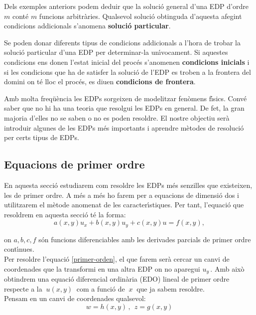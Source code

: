 \documentclass[12pt]{article}
\begin{document}
Dels exemples anteriors podem deduir que la soluci{\'o} general d'una EDP d'ordre $m$ cont{\'e} $m$ funcions arbitr{\`a}ries.
Qualsevol soluci{\'o} obtinguda d'aquesta afegint condicions addicionals s'anomena \textbf{soluci{\'o} particular}.

Se poden donar diferents tipus de condicions addicionals a l'hora de trobar la soluci{\'o} particular d'una EDP
per  determinar-la un{\'\i}vocament. Si aquestes condicions ens donen l'estat inicial del proc{\'e}s s'anomenen \textbf{condicions inicials} i si les condicions que ha de satisfer la soluci{\'o} de l'EDP es troben a la frontera del domini on t{\'e} lloc el proc{\'e}s,  es diuen \textbf{condicions de frontera}.

\vspace{0.4cm}
Amb molta freq{\"u}{\`e}ncia les EDPs sorgeixen de modelitzar fen{\`o}mens f{\'\i}sics. Conv{\'e} saber que no hi ha una teoria que resolgui les EDPs en general. De fet, la gran majoria d'elles no se saben o no es poden resoldre. El nostre objectiu ser{\`a} introduir algunes de les EDPs m{\'e}s importants i aprendre m{\`e}todes de resoluci{\'o} per certs tipus de EDPs.


\subsection{Equacions de primer ordre}

En aquesta secci{\'o} estudiarem com resoldre les EDPs m{\'e}s senzilles que existeixen, les de primer ordre. A m{\'e}s a m{\'e}s
ho farem per a equacions de dimensi{\'o} dos i utilitzarem el m{\`e}tode anomenat de les caracter{\'\i}stiques. Per tant, l'equaci{\'o} que resoldrem en aquesta secci{\'o} t{\'e} la forma:
\begin{equation}\label{primer-orden}
 a(x,y)u_x+b(x,y)u_y+c(x,y)u=f(x,y),
\end{equation}

on $a,b,c,f$ s{\'o}n funcions diferenciables amb les derivades parcials de primer ordre cont{\'\i}nues. \\


Per resoldre l'equaci{\'o} \eqref{primer-orden}, el que farem ser{\`a} cercar un canvi de coordenades que la transformi en una altra EDP on no aparegui $u_y\,.$ Amb aix{\`o} obtindrem una equaci{\'o} diferencial ordin{\`a}ria (EDO) lineal de primer ordre respecte a la  $\ u(x,y)\ $ com a funci{\'o} de $\ x\ $ que ja sabem resoldre.\\

Pensam en un canvi de coordenades qualsevol:
$$
w=h(x,y)\,,\ \  z=g(x,y)
$$
\end{document}
